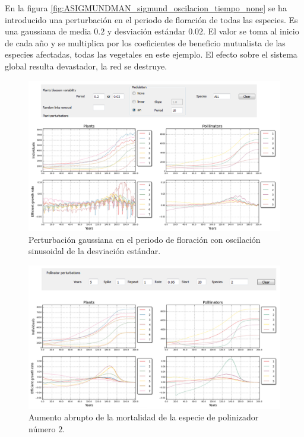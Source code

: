 En la figura \ref{fig:ASIGMUNDMAN_sigmund_oscilacion_tiempo_none} se ha introducido una perturbación en el periodo de floración de todas las especies. Es una gaussiana de media $0.2$ y desviación estándar $0.02$. El valor se toma al inicio de cada año y se multiplica por los coeficientes de beneficio mutualista de las especies afectadas, todas las vegetales en este ejemplo. El efecto sobre el sistema global resulta devastador, la red se destruye.

\begin{figure}[hp!]
\centering
\includegraphics[scale=1]{ManFigs/sigmund_oscilacion_tiempo_sin.png}
\caption{Perturbación gaussiana en el periodo de floración con oscilación sinusoidal de la desviación estándar.}
\label{fig:ASIGMUNDMAN_sigmund_oscilacion_tiempo_sin}
\end{figure}

\begin{figure}[hp!]
\centering
\includegraphics[scale=1]{ManFigs/sigmund_95.png}
\caption{Aumento abrupto de la mortalidad de la especie de polinizador número $2$.}
\label{fig:ASIGMUNDMAN_sigmund_95}
\end{figure}

